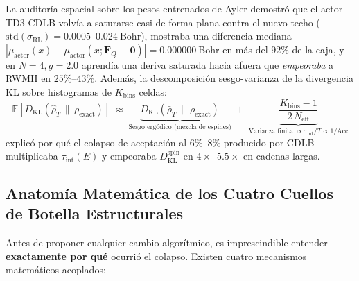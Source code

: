 \documentclass[10pt,a4paper]{article}
\begin{document}
La auditoría espacial sobre los pesos entrenados de Ayler demostró que el actor TD3-CDLB volvía a saturarse casi de forma plana contra el nuevo techo ($\mathrm{std}(\sigma_{\mathrm{RL}}) = 0.0005\text{--}0.024\ \mathrm{Bohr}$), mostraba una diferencia mediana $|\mu_{\mathrm{actor}}(x) - \mu_{\mathrm{actor}}(x; \bm{F}_Q \equiv \bm{0})| = 0.000000\ \mathrm{Bohr}$ en más del $92\%$ de la caja, y en $N=4, g=2.0$ aprendía una deriva saturada hacia afuera que \textit{empeoraba} a RWMH en $25\%\text{--}43\%$. Además, la descomposición sesgo-varianza de la divergencia KL sobre histogramas de $K_{\mathrm{bins}}$ celdas:
\begin{equation}
\mathbb{E}\!\left[D_{\mathrm{KL}}(\hat{\rho}_T \,\|\, \rho_{\mathrm{exact}})\right] \;\approx\; \underbrace{D_{\mathrm{KL}}(\bar{\rho}_T \,\|\, \rho_{\mathrm{exact}})}_{\text{Sesgo ergódico (mezcla de espines)}} \;+\; \underbrace{\frac{K_{\mathrm{bins}} - 1}{2\,N_{\mathrm{eff}}}}_{\text{Varianza finita } \propto \tau_{\mathrm{int}}/T \propto 1/\mathrm{Acc}}
\label{eq:kl_bias_var}
\end{equation}
explicó por qué el colapso de aceptación al $6\%\text{--}8\%$ producido por CDLB multiplicaba $\tau_{\mathrm{int}}(E)$ y empeoraba $D_{\mathrm{KL}}^{\mathrm{spin}}$ en $4\times\text{--}5.5\times$ en cadenas largas.

\subsection{Anatomía Matemática de los Cuatro Cuellos de Botella Estructurales}

Antes de proponer cualquier cambio algorítmico, es imprescindible entender \textbf{exactamente por qué} ocurrió el colapso. Existen cuatro mecanismos matemáticos acoplados:
\end{document}
